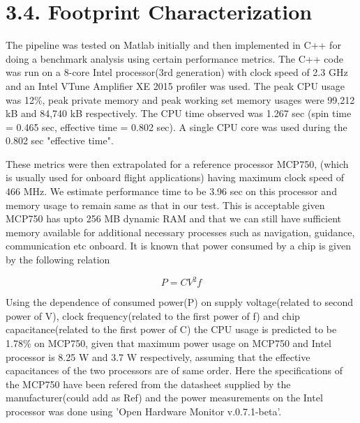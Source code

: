 \documentclass{article}
\title{}
\author{}
\date{\vspace{-5ex}}
\begin{document}
	\maketitle
	
	\section*{3.4. Footprint Characterization}
The pipeline was tested on Matlab initially and then implemented in C++ for doing a benchmark analysis using certain performance metrics. The C++ code was run on a 8-core Intel processor(3rd generation) with clock speed of 2.3 GHz and an Intel VTune Amplifier XE 2015 profiler was used. The peak CPU usage was 12\%, peak private memory and peak working set memory usages were 99,212 kB and 84,740 kB respectively. The CPU time observed was 1.267 sec (spin time = 0.465 sec, effective time = 0.802 sec). A single CPU core was used during the 0.802 sec "effective time". \newline

These metrics were then extrapolated for a reference processor MCP750, (which is usually used for onboard flight applications)  having maximum clock speed of 466 MHz. We estimate performance time to be 3.96 sec on this processor and memory usage to remain same as that in our test.  This is acceptable given MCP750 has upto 256 MB dynamic RAM and that we can still have sufficient memory available for additional necessary processes such as navigation, guidance, communication etc onboard. It is known that power consumed by a chip is given by the following relation

\begin{equation}
P=CV^{2}f
\end{equation}



Using the dependence of consumed power(P) on supply voltage(related to second power of V), clock frequency(related to the first power of f) and chip capacitance(related to the first power of C) the CPU usage is predicted to be 1.78\% on MCP750, given that maximum power usage on MCP750 and Intel processor is 8.25 W and 3.7 W respectively, assuming that the effective capacitances of the two processors are of same order. Here the specifications of the MCP750 have been refered from the datasheet supplied by the manufacturer(could add as Ref) and the power measurements on the Intel processor was done using 'Open Hardware Monitor v.0.7.1-beta'. 


	
\end{document}
